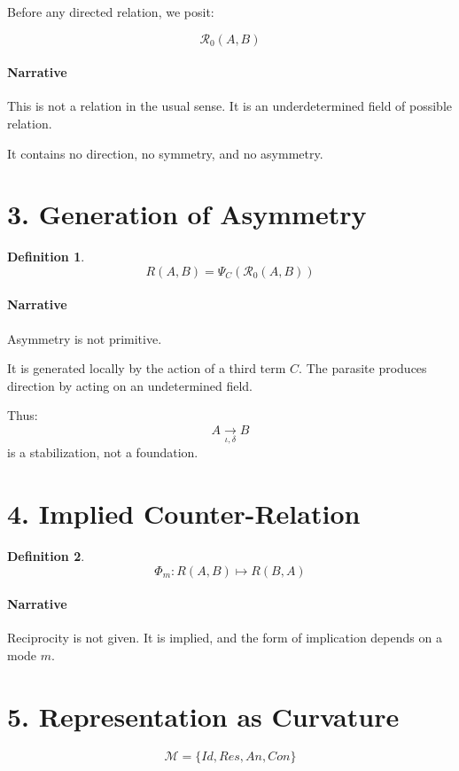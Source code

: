 \documentclass[11pt]{article}
\newtheorem{definition}{Definition}
\begin{document}
Before any directed relation, we posit:

\[
\mathcal{R}_0(A,B)
\]

\paragraph{Narrative}
This is not a relation in the usual sense.
It is an underdetermined field of possible relation.

It contains no direction, no symmetry, and no asymmetry.

\section{3. Generation of Asymmetry}

\begin{definition}
\[
R(A,B) = \Psi_C(\mathcal{R}_0(A,B))
\]
\end{definition}

\paragraph{Narrative}
Asymmetry is not primitive.

It is generated locally by the action of a third term $C$.
The parasite produces direction by acting on an undetermined field.

Thus:
\[
A \xrightarrow[\iota,\delta]{} B
\]
is a stabilization, not a foundation.

\section{4. Implied Counter-Relation}

\begin{definition}
\[
\Phi_m : R(A,B) \mapsto R(B,A)
\]
\end{definition}

\paragraph{Narrative}
Reciprocity is not given.
It is implied, and the form of implication depends on a mode $m$.

\section{5. Representation as Curvature}

\[
\mathcal{M} = \{Id, Res, An, Con\}
\]
\end{document}
